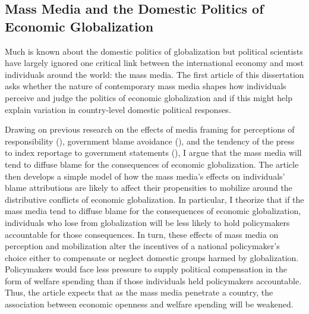 \documentclass[12pt]{report}
\begin{document}
\subsection{Mass Media and the Domestic Politics of Economic Globalization}

Much is known about the domestic politics of globalization but political scientists
have largely ignored one critical link between the international economy and most individuals around
the world: the mass media. The first article of this dissertation asks whether the nature of contemporary mass media shapes how individuals perceive and judge the politics of economic globalization and if this might help explain variation in country-level domestic political responses.

Drawing on previous research on the effects of media framing for perceptions of responsibility (\citealt{Iyengar:1991uf, Iyengar:1989tm}), government blame avoidance (\citealt{Weaver:1986ku, McGraw:1990kk}), and the tendency of the press to index reportage to government statements (\citealt{Bennett:1990bp, Zaller:1996vs}), I argue that the mass media will tend to diffuse blame for the consequences of economic globalization. The article then develops a simple model of how the mass media's effects on individuals' blame attributions are likely to affect their propensities to mobilize around the distributive conflicts of economic
globalization. In particular, I theorize that if the mass media tend to diffuse blame for the consequences of economic globalization, individuals who lose from globalization will be less likely to hold policymakers accountable for those consequences. In turn, these effects of mass media on perception and mobilization alter the incentives of a
national policymaker's choice either to compensate or neglect domestic groups harmed by
globalization. Policymakers would face less pressure to supply political compensation in the form of welfare spending than if those individuals held policymakers accountable. Thus, the article expects that as the mass media penetrate a country, the association between economic openness and welfare spending will be weakened.
\end{document}
